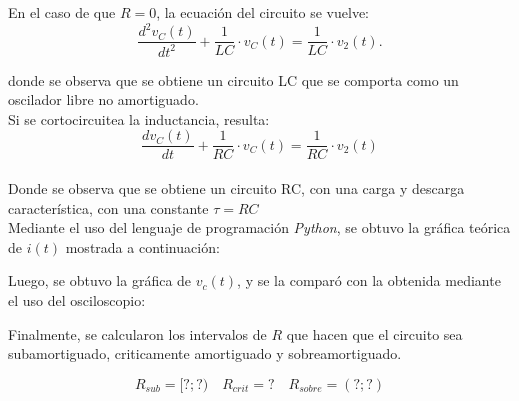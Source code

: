 \documentclass[a4paper]{article}
\begin{document}
En el caso de que $R=0$, la ecuación del circuito se vuelve:
\begin{equation}
\frac{d^{2}v_{C}(t)}{dt^{2}}+\frac{1}{LC}\cdot v_{C}(t)=\frac{1}{LC}\cdot v_{2}(t).
\end{equation}



donde se observa que se obtiene un circuito LC que se comporta como un oscilador libre no amortiguado.\\

Si se cortocircuitea la inductancia, resulta:
\begin{equation}
\frac{dv_{C}(t)}{dt}+\frac{1}{RC}\cdot v_{C}(t)=\frac{1}{RC}\cdot v_{2}(t)
\end{equation}\\
Donde se observa que se obtiene un circuito RC, con una carga y descarga característica, con una constante $\tau = RC$\\

Mediante el uso del lenguaje de programación \textit{Python}, se obtuvo la gráfica teórica de $i(t)$ mostrada a continuación:

Luego, se obtuvo la gráfica de $v_c(t)$, y se la comparó con la obtenida mediante el uso del osciloscopio:

Finalmente, se calcularon los intervalos de $R$ que hacen que el circuito sea subamortiguado, criticamente amortiguado y sobreamortiguado.

\[R_{sub}=[?;?) \quad R_{crit}= ? \quad R_{sobre}=(?;?)\]
\end{document}
